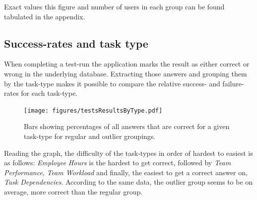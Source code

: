 \documentclass[nofilelist,dvipsnames]{cslthse-msc}
\begin{document}
{        Exact values this figure and number of users in each group can be found
        tabulated in the appendix. 

%

      \subsection{Success-rates and task type}

        When completing a test-run the application marks the result as
        either correct or wrong in the underlying database. Extracting
        those answers and grouping them by the task-type makes it possible to
        compare the relative success- and failure-rates for each task-type.

				\begin{figure}[h!]
					\centering
          \texttt{[image: figures/testsResultsByType.pdf]}
          \caption{
            Bars showing percentages of all answers that are correct for a
            given task-type for regular and outlier groupings.
          }
				\end{figure}

        Reading the graph, the difficulty of the task-types in order of hardest
        to easiest is as follows: \textit{Employee Hours} is the hardest to get
        correct, followed by \textit{Team Performance}, \textit{Team Workload}
        and finally, the easiest to get a correct answer on, \textit{Task
          Dependencies}. According to the same data, the outlier group seems to
        be on average, more correct than the regular group.



}
\end{document}
